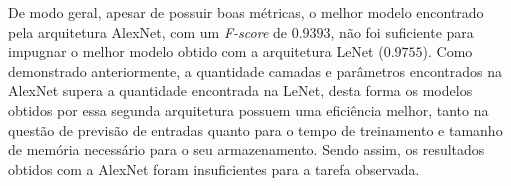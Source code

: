 De modo geral, apesar de possuir boas métricas, o melhor modelo encontrado pela arquitetura AlexNet, com um \emph{F-score} de $0.9393$, não foi suficiente para impugnar o melhor modelo obtido com a arquitetura LeNet ($0.9755$). Como demonstrado anteriormente, a quantidade camadas e parâmetros encontrados na AlexNet supera a quantidade encontrada na LeNet, desta forma os modelos obtidos por essa segunda arquitetura possuem uma eficiência melhor, tanto na questão de previsão de entradas quanto para o tempo de treinamento e tamanho de memória necessário para o seu armazenamento. Sendo assim, os resultados obtidos com a AlexNet foram insuficientes para a tarefa observada.
